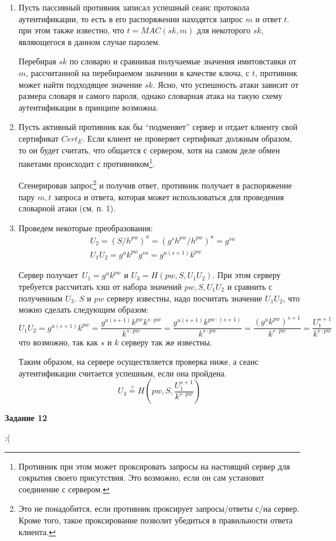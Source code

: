 \documentclass[12pt, a4paper]{extarticle}
\newenvironment*{dummyenv}{}{}
\newcommand{\mysection}[1]{
    \addcontentsline{toc}{section}{#1}
    \begin{dummyenv}
        \bfseries\large #1
    \end{dummyenv}
}
\begin{document}
\begin{enumerate}
	\item Пусть пассивный противник записал успешный сеанс протокола аутентификации, то есть в его
		распоряжении находятся запрос $m$ и ответ $t$. при этом также известно, что $t = MAC(sk, m)$
		для некоторого $sk$, являющегося в данном случае паролем.
		
		Перебирая $sk$ по словарю и сравнивая получаемые значения имитовставки от $m$, рассчитанной
		на перебираемом значении в качестве ключа, с $t$, противник может найти подходящее значение
		$sk$. Ясно, что успешность атаки зависит от размера словаря и самого пароля, однако словарная
		атака на такую схему аутентификации в принципе возможна.
		
	\item Пусть активный противник как бы ``подменяет'' сервер и отдает клиенту свой сертификат
		$Cert_E$. Если клиент не проверяет сертификат должным образом, то он будет считать, что
		общается с сервером, хотя на самом деле обмен пакетами происходит с противником\footnote{
		Противник при этом может проксировать запросы на настоящий сервер для сокрытия своего
		присутствия. Это возможно, если он сам установит соединение с сервером.}.
		
		Сгенерировав запрос\footnote{Это не понадобится, если противник проксирует запросы/ответы 
		с/на сервер. Кроме того, такое проксирование позволит убедиться в правильности ответа
		клиента.} и получив ответ, противник получает в распоряжение пару $m, t$ запроса
		и ответа, которая может использоваться для проведения словарной атаки (см. п. 1). 
	
	\item Проведем некоторые преобразования:
		\begin{equation*}
			\begin{split}
				& U_2 = (S / h^{pw})^u = (g^s h^{pw} / h^{pw})^u = g^{su} \\
				& U_1 U_2 = g^u k^{pw} g^{su} = g^{u(s + 1)} k^{pw}
			\end{split}
		\end{equation*}
		
		Сервер получает $U_1 = g^u k^{pw}$ и $U_3 = H(pw, S, U_1 U_2)$. При этом серверу требуется
		рассчитать хэш от набора значений $pw, S, U_1 U_2$ и сравнить с полученным $U_3$. $S$ и 
		$pw$ серверу известны, надо посчитать значение $U_1 U_2$, что можно сделать следующим
		образом:
		\begin{equation*}
			U_1 U_2 = g^{u(s + 1)} k^{pw} = \frac{g^{u(s + 1)} k^{pw} k^{s \cdot pw}}{k^{s \cdot pw}} =
				\frac{g^{u(s + 1)} k^{pw \cdot (s + 1)}}{k^{s \cdot pw}} =
				\frac{(g^u k^{pw})^{s + 1}}{k^{s \cdot pw}} = 
				\frac{U_1^{s + 1}}{k^{s \cdot pw}}	
		\end{equation*}
		что возможно, так как $s$ и $k$ серверу так же известны.
		
		Таким образом, на сервере осуществляется проверка ниже, а сеанс аутентификации считается
		успешным, если она пройдена.
		\begin{equation*}
			U_3 \stackrel{?}{=} H\left(pw, S, \frac{U_1^{s + 1}}{k^{s \cdot pw}}\right)
		\end{equation*}
\end{enumerate}

\mysection{Задание 12}

:(
\end{document}
